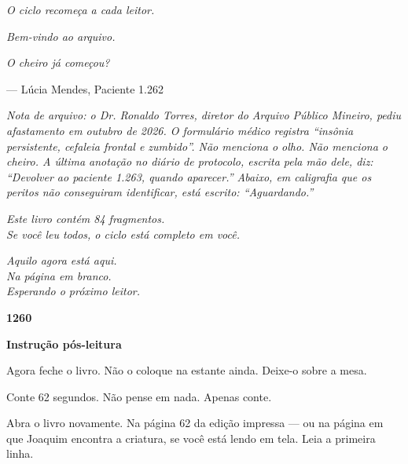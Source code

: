 \begin{center}
\vspace*{2em}
\textit{O ciclo recomeça a cada leitor.}

\vspace{2em}
\textit{Bem-vindo ao arquivo.}

\vspace{0.5em}
\textit{O cheiro já começou?}

\vspace{1.5em}
--- Lúcia Mendes, Paciente 1.262
\end{center}

\vspace{1em}
\noindent\textit{Nota de arquivo: o Dr. Ronaldo Torres, diretor do Arquivo Público Mineiro, pediu afastamento em outubro de 2026. O formulário médico registra ``insônia persistente, cefaleia frontal e zumbido''. Não menciona o olho. Não menciona o cheiro. A última anotação no diário de protocolo, escrita pela mão dele, diz: ``Devolver ao paciente 1.263, quando aparecer.'' Abaixo, em caligrafia que os peritos não conseguiram identificar, está escrito: ``Aguardando.''}

\vspace{1em}
\begin{center}
\textit{Este livro contém 84 fragmentos.}\\
\textit{Se você leu todos, o ciclo está completo em você.}

\vspace{1.5em}
\textit{Aquilo agora está aqui.}\\
\textit{Na página em branco.}\\
\textit{Esperando o próximo leitor.}

\vspace{1.5em}
\textbf{1260}
\end{center}

\vspace{2em}
\noindent\textbf{Instrução pós-leitura}

\noindent Agora feche o livro. Não o coloque na estante ainda. Deixe-o sobre a mesa.

\noindent Conte 62 segundos. Não pense em nada. Apenas conte.

\noindent Abra o livro novamente. Na página 62 da edição impressa --- ou na página em que Joaquim encontra a criatura, se você está lendo em tela. Leia a primeira linha.

